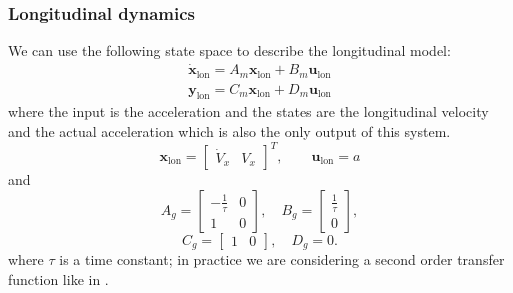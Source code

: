 \documentclass[conference, 11pt]{IEEEtran}
\begin{document}
\subsubsection{Longitudinal dynamics}
We can use the following state space to describe the longitudinal model:
\begin{equation}
\label{eqn:longi_dynamics_simple_model_ss}
\begin{array}{ll}
\dot{\textbf{x}}_{\text{lon}} =A_m \textbf{x}_{\text{lon}}+ B_m\textbf{u}_{\text{lon}}\\
\textbf{y}_{\text{lon}} =C_m \textbf{x}_{\text{lon}} + D_m \textbf{u}_{\text{lon}}
\end{array}
\end{equation}
where the input is the acceleration and the states are the longitudinal velocity and the actual acceleration which is also the only output of this system.
\begin{equation*}
\textbf{x}_{\text{lon}} = \begin{bmatrix}
\dot{V}_x&V_x
\end{bmatrix}^T,
\qquad
\textbf{u}_{\text{lon}} = a
\end{equation*}
and
\[ 
A_g=\begin{bmatrix}
-\frac{1}{\tau}&0\\1&0
\end{bmatrix},
\quad
B_g=\begin{bmatrix}
\frac{1}{\tau}\\
0
\end{bmatrix},
\]
\[
C_g=\begin{bmatrix}
1&0
\end{bmatrix}, 
\quad
D_g=0.
\]
where $\tau$ is a time constant; in practice we are considering a second order transfer function like in \cite{long_tf}.
\end{document}
